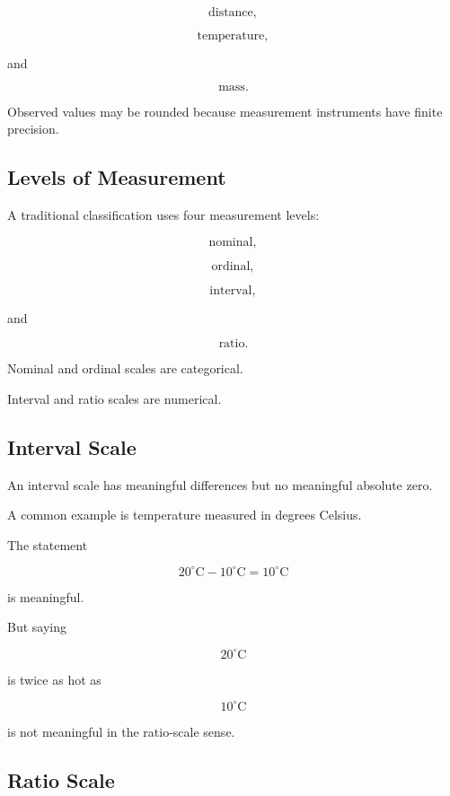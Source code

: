 \[
\text{distance},
\]

\[
\text{temperature},
\]

and

\[
\text{mass}.
\]

Observed values may be rounded because measurement instruments have
finite precision.

\subsection{Levels of Measurement}
\label{subsec:levels-of-measurement}

A traditional classification uses four measurement levels:

\[
\boxed{
\text{nominal},
}
\]

\[
\boxed{
\text{ordinal},
}
\]

\[
\boxed{
\text{interval},
}
\]

and

\[
\boxed{
\text{ratio}.
}
\]

Nominal and ordinal scales are categorical.

Interval and ratio scales are numerical.

\subsection{Interval Scale}
\label{subsec:interval-scale}

An interval scale has meaningful differences but no meaningful absolute
zero.

A common example is temperature measured in degrees Celsius.

The statement

\[
20^\circ\text{C}
-
10^\circ\text{C}
=
10^\circ\text{C}
\]

is meaningful.

But saying

\[
20^\circ\text{C}
\]

is twice as hot as

\[
10^\circ\text{C}
\]

is not meaningful in the ratio-scale sense.

\subsection{Ratio Scale}
\label{subsec:ratio-scale}

